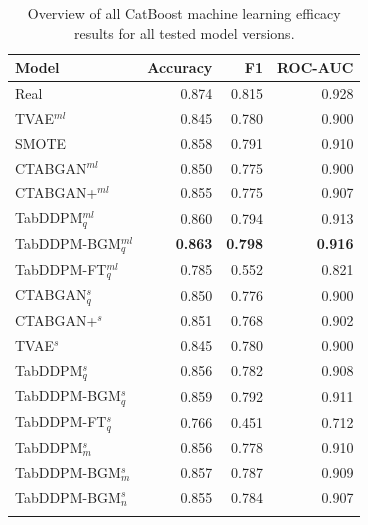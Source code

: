 \begin{table}[h]
	\centering
	\begin{tabular}{lrrr}
		\toprule
		\textbf{Model}        & \textbf{Accuracy} & \textbf{F1}    & \textbf{ROC-AUC} \\
		\midrule
		Real                  & 0.874              & 0.815          & 0.928            \\
		TVAE$^{ml}$           & 0.845              & 0.780          & 0.900            \\
		SMOTE                 & 0.858              & 0.791          & 0.910            \\
		CTABGAN$^{ml}$        & 0.850              & 0.775          & 0.900            \\
		CTABGAN+$^{ml}$       & 0.855              & 0.775          & 0.907            \\
		TabDDPM$^{ml}_q$      & 0.860              & 0.794          & 0.913            \\
		TabDDPM-BGM$^{ml}_q$  & \textbf{0.863}     & \textbf{0.798} & \textbf{0.916}   \\
		TabDDPM-FT$^{ml}_q$   & 0.785              & 0.552          & 0.821            \\
		CTABGAN$^{s}_q$       & 0.850              & 0.776          & 0.900            \\
		CTABGAN+$^{s}$        & 0.851              & 0.768          & 0.902            \\
		TVAE$^{s}$            & 0.845              & 0.780          & 0.900            \\
		TabDDPM$^{s}_q$       & 0.856              & 0.782          & 0.908            \\
		TabDDPM-BGM$^{s}_q$   & 0.859              & 0.792          & 0.911            \\
		TabDDPM-FT$^{s}_q$    & 0.766              & 0.451          & 0.712            \\
		TabDDPM$^{s}_m$       & 0.856              & 0.778          & 0.910            \\
		TabDDPM-BGM$^{s}_m$   & 0.857              & 0.787          & 0.909            \\
		TabDDPM-BGM$^{s}_{n}$ & 0.855              & 0.784          & 0.907            \\
		\bottomrule
		\multicolumn{4}{c}{}\\[-0.6em]
	\end{tabular}
	\caption[Overview all ML-Efficacy results]{Overview of all CatBoost machine learning efficacy results for all tested model versions.}
	\label{tab:ml-all}
\end{table}


